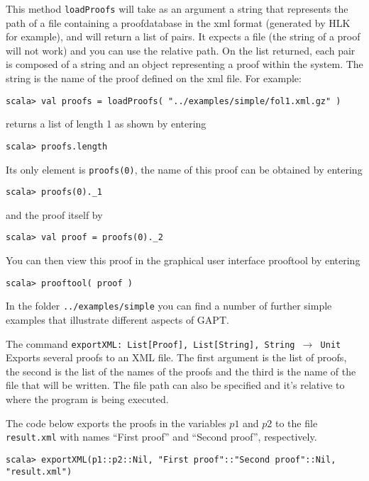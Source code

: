 \documentclass[a4paper,11pt]{article}
\newcommand{\cli}[1]{{\tt {#1}}}
\begin{document}
This method \texttt{loadProofs} will take as an argument a string that represents the path of a file
containing a proofdatabase in the xml format (generated by HLK for example), and will return a list 
of pairs. It expects a file (the string of a proof will not work) and you can use 
the relative path. On the list returned, each pair is composed of a string and 
an object representing a proof within the system. The string is the name of the 
proof defined on the xml file. For example:
%
\begin{lstlisting}
scala> val proofs = loadProofs( "../examples/simple/fol1.xml.gz" )
\end{lstlisting}
%
returns a list of length 1 as shown by entering
%
\begin{lstlisting}
scala> proofs.length
\end{lstlisting}
%
Its only element is \cli{proofs(0)}, the name of this proof can be obtained by
entering
%
\begin{lstlisting}
scala> proofs(0)._1
\end{lstlisting}
%
and the proof itself by
%
\begin{lstlisting}
scala> val proof = proofs(0)._2
\end{lstlisting}
%
You can then view this proof in the graphical user interface prooftool by 
entering
%
\begin{lstlisting}
scala> prooftool( proof )
\end{lstlisting}
%
In the folder \cli{../examples/simple} you can find a number of further simple
examples that illustrate different aspects of GAPT.





The command \texttt{exportXML: List[Proof], List[String], String $\rightarrow$ Unit}
Exports several proofs to an XML file. The first argument is the list of proofs,
the second is the list of the names of the proofs and the third is the name of
the file that will be written. The file path can also be specified and it's
relative to where the program is being executed.

The code below exports the proofs in the variables $p1$ and $p2$ to the file
\texttt{result.xml} with names ``First proof'' and ``Second proof'',
respectively.
\begin{lstlisting}
scala> exportXML(p1::p2::Nil, "First proof"::"Second proof"::Nil, "result.xml")
\end{lstlisting}
\end{document}
